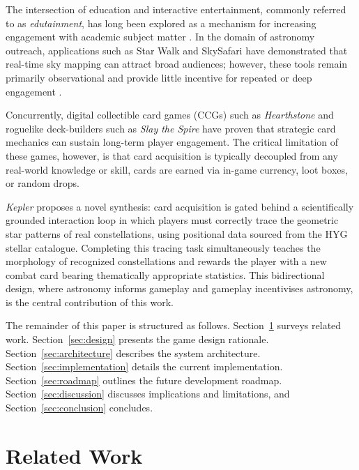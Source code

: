 \documentclass[conference]{IEEEtran}
\begin{document}
The intersection of education and interactive entertainment, commonly referred to as \textit{edutainment}, has long been explored as a mechanism for increasing engagement with academic subject matter \cite{prensky2001digital}. In the domain of astronomy outreach, applications such as Star Walk and SkySafari have demonstrated that real-time sky mapping can attract broad audiences; however, these tools remain primarily observational and provide little incentive for repeated or deep engagement \cite{schaller2012mobile}.

Concurrently, digital collectible card games (CCGs) such as \textit{Hearthstone} \cite{hearthstone} and roguelike deck-builders such as \textit{Slay the Spire} \cite{slayspire} have proven that strategic card mechanics can sustain long-term player engagement. The critical limitation of these games, however, is that card acquisition is typically decoupled from any real-world knowledge or skill, cards are earned via in-game currency, loot boxes, or random drops.

\textit{Kepler} proposes a novel synthesis: card acquisition is gated behind a scientifically grounded interaction loop in which players must correctly trace the geometric star patterns of real constellations, using positional data sourced from the HYG stellar catalogue. Completing this tracing task simultaneously teaches the morphology of recognized constellations and rewards the player with a new combat card bearing thematically appropriate statistics. This bidirectional design, where astronomy informs gameplay and gameplay incentivises astronomy, is the central contribution of this work.

The remainder of this paper is structured as follows. Section~\ref{sec:related} surveys related work. Section~\ref{sec:design} presents the game design rationale. Section~\ref{sec:architecture} describes the system architecture. Section~\ref{sec:implementation} details the current implementation. Section~\ref{sec:roadmap} outlines the future development roadmap. Section~\ref{sec:discussion} discusses implications and limitations, and Section~\ref{sec:conclusion} concludes.

\section{Related Work}
\label{sec:related}
\end{document}
